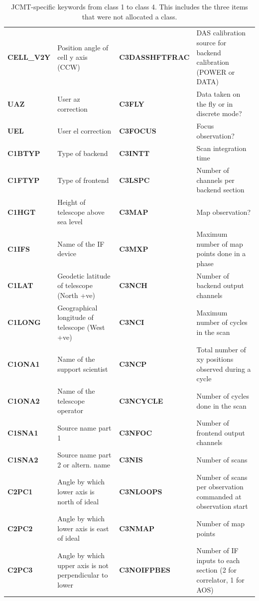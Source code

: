 \documentclass[final,authoryear,5p,times,twocolumn]{elsarticle}
\begin{document}
\begin{table}[t]
\caption{JCMT-specific keywords from class 1 to class 4. This includes the three items that were not allocated a class.}
\label{tab:appa1}
\begin{center}
\begin{tabular}{|lp{2.0in}|lp{2.0in}|}
\hline
\textbf{CELL\_V2Y} & Position angle of cell y axis (CCW) & \textbf{C3DASSHFTFRAC} & DAS calibration source for backend calibration (POWER or DATA)\\
\textbf{UAZ} & User az correction & \textbf{C3FLY} & Data taken on the fly or in discrete mode?\\
\textbf{UEL} & User el correction & \textbf{C3FOCUS} & Focus observation?\\
\textbf{C1BTYP} & Type of backend & \textbf{C3INTT} & Scan integration time\\
\textbf{C1FTYP} & Type of frontend & \textbf{C3LSPC} & Number of channels per backend section\\
\textbf{C1HGT} & Height of telescope above sea level & \textbf{C3MAP} & Map observation?\\
\textbf{C1IFS} & Name of the IF device & \textbf{C3MXP} & Maximum number of map points done in a phase\\
\textbf{C1LAT} & Geodetic latitude of telescope (North +ve) & \textbf{C3NCH} & Number of backend output channels\\
\textbf{C1LONG} & Geographical longitude of telescope (West +ve) & \textbf{C3NCI} & Maximum number of cycles in the scan\\
\textbf{C1ONA1} & Name of the support scientist & \textbf{C3NCP} & Total number of xy positions observed during a cycle\\
\textbf{C1ONA2} & Name of the telescope operator & \textbf{C3NCYCLE} & Number of cycles done in the scan\\
\textbf{C1SNA1} & Source name part 1 & \textbf{C3NFOC} & Number of frontend output channels\\
\textbf{C1SNA2} & Source name part 2 or altern. name & \textbf{C3NIS} & Number of scans\\
\textbf{C2PC1} & Angle by which lower axis is north of ideal & \textbf{C3NLOOPS} & Number of scans per observation commanded at observation start\\
\textbf{C2PC2} & Angle by which lower axis is east of ideal & \textbf{C3NMAP} & Number of map points\\
\textbf{C2PC3} & Angle by which upper axis is not perpendicular to lower & \textbf{C3NOIFPBES} & Number of IF inputs to each section (2 for correlator, 1 for AOS)\\

\end{tabular}
\end{center}
\end{table}
\end{document}
